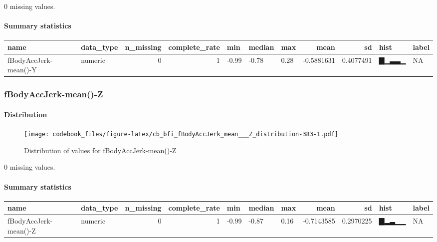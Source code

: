 \documentclass[
]{article}
\begin{document}
0 missing values.

\hypertarget{fBodyAccJerk_mean___Y_summary}{%
\paragraph{Summary statistics}\label{fBodyAccJerk_mean___Y_summary}}

\begin{longtable}[]{@{}llrrlllrrll@{}}
\toprule
name & data\_type & n\_missing & complete\_rate & min & median & max &
mean & sd & hist & label \\
\midrule
\endhead
fBodyAccJerk-mean()-Y & numeric & 0 & 1 & -0.99 & -0.78 & 0.28 &
-0.5881631 & 0.4077491 & ▇▁▃▃▁ & NA \\
\bottomrule
\end{longtable}

\hypertarget{fBodyAccJerk_mean___Z}{%
\subsubsection{fBodyAccJerk-mean()-Z}\label{fBodyAccJerk_mean___Z}}

\hypertarget{fBodyAccJerk_mean___Z_distribution}{%
\paragraph{Distribution}\label{fBodyAccJerk_mean___Z_distribution}}

\begin{figure}
\centering
\texttt{[image: codebook\_files/figure-latex/cb\_bfi\_fBodyAccJerk\_mean\_\_\_Z\_distribution-383-1.pdf]}
\caption{Distribution of values for fBodyAccJerk-mean()-Z}
\end{figure}

0 missing values.

\hypertarget{fBodyAccJerk_mean___Z_summary}{%
\paragraph{Summary statistics}\label{fBodyAccJerk_mean___Z_summary}}

\begin{longtable}[]{@{}llrrlllrrll@{}}
\toprule
name & data\_type & n\_missing & complete\_rate & min & median & max &
mean & sd & hist & label \\
\midrule
\endhead
fBodyAccJerk-mean()-Z & numeric & 0 & 1 & -0.99 & -0.87 & 0.16 &
-0.7143585 & 0.2970225 & ▇▂▃▁▁ & NA \\
\bottomrule
\end{longtable}
\end{document}
